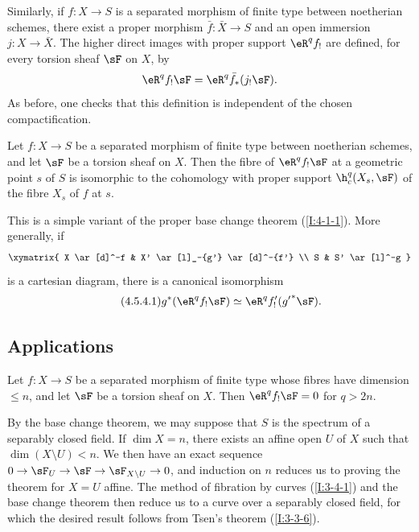 \documentclass[oneside]{book}
\begin{document}
Similarly, if $f:X\to S$ is a separated morphism of finite type between
noetherian schemes, there exist a proper morphism $\bar f:\bar X\to S$
and an open immersion $j:X\to\bar X$. The higher direct images with
proper support $\eR^qf_!$ are defined, for every torsion sheaf $\sF$ on
$X$, by
\[
  \eR^q f_! \sF = \eR^q \bar f_*(j_! \sF) \text{.}
\]
As before, one checks that this definition is independent of the chosen
compactification.

\begin{theorem}\label{I:4-5-4}
Let $f:X\to S$ be a separated morphism of finite type between noetherian
schemes, and let $\sF$ be a torsion sheaf on $X$. Then the fibre of
$\eR^qf_!\sF$ at a geometric point $s$ of $S$ is isomorphic to the
cohomology with proper support $\h_c^q(X_s,\sF)$ of the fibre $X_s$ of
$f$ at $s$.
\end{theorem}

This is a simple variant of the proper base change theorem
(\ref{I:4-1-1}). More generally, if
\[\xymatrix{
  X \ar[d]^-f
    & X' \ar[l]_-{g'} \ar[d]^-{f'} \\
  S
    & S' \ar[l]^-g
}\]
is a cartesian diagram, there is a canonical isomorphism
\begin{equation*}\tag{4.5.4.1}\label{I:eq:4-5-4-1}
  g^* (\eR^q f_! \sF) \simeq \eR^q f'_!({g'}^* \sF) \text{.}
\end{equation*}

\subsection{Applications}\label{I:4-6}

\begin{theorem}\label{I:4-6-1}
Let $f:X\to S$ be a separated morphism of finite type whose fibres have
dimension $\leqslant n$, and let $\sF$ be a torsion sheaf on $X$. Then
$\eR^qf_!\sF=0$ for $q>2n$.
\end{theorem}

By the base change theorem, we may suppose that $S$ is the spectrum of a
separably closed field. If $\dim X=n$, there exists an affine open
$U$ of $X$ such that $\dim(X\setminus U)<n$. We then have an exact
sequence $0\to\sF_U\to\sF\to\sF_{X\setminus U}\to0$, and induction on
$n$ reduces us to proving the theorem for $X=U$ affine. The method of
fibration by curves (\ref{I:3-4-1}) and the base change theorem then
reduce us to a curve over a separably closed field, for which the desired
result follows from Tsen's theorem (\ref{I:3-3-6}).
\end{document}

